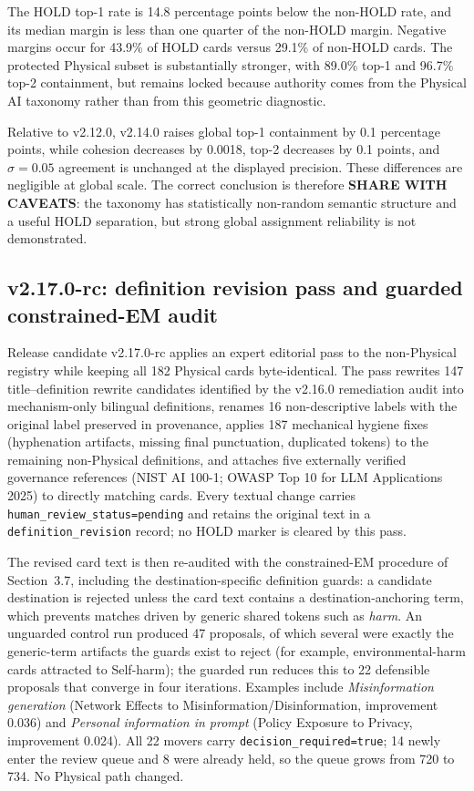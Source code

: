 \documentclass[11pt,a4paper]{article}
\newcommand{\code}[1]{\texttt{#1}}
\begin{document}
The HOLD top-1 rate is 14.8 percentage points below the non-HOLD rate, and its
median margin is less than one quarter of the non-HOLD margin. Negative margins
occur for 43.9\% of HOLD cards versus 29.1\% of non-HOLD cards. The protected
Physical subset is substantially stronger, with 89.0\% top-1 and 96.7\% top-2
containment, but remains locked because authority comes from the Physical AI
taxonomy rather than from this geometric diagnostic.

Relative to v2.12.0, v2.14.0 raises global top-1 containment by 0.1 percentage
points, while cohesion decreases by 0.0018, top-2 decreases by 0.1 points, and
$\sigma=0.05$ agreement is unchanged at the displayed precision. These
differences are negligible at global scale. The correct conclusion is therefore
\textbf{SHARE WITH CAVEATS}: the taxonomy has statistically non-random semantic
structure and a useful HOLD separation, but strong global assignment
reliability is not demonstrated.


\subsection{v2.17.0-rc: definition revision pass and guarded constrained-EM audit}

Release candidate v2.17.0-rc applies an expert editorial pass to the
non-Physical registry while keeping all 182 Physical cards byte-identical.
The pass rewrites 147 title--definition rewrite candidates identified by the
v2.16.0 remediation audit into mechanism-only bilingual definitions, renames
16 non-descriptive labels with the original label preserved in provenance,
applies 187 mechanical hygiene fixes (hyphenation artifacts, missing final
punctuation, duplicated tokens) to the remaining non-Physical definitions,
and attaches five externally verified governance references (NIST AI 100-1;
OWASP Top 10 for LLM Applications 2025) to directly matching cards. Every
textual change carries \code{human\_review\_status=pending} and retains the
original text in a \code{definition\_revision} record; no HOLD marker is
cleared by this pass.

The revised card text is then re-audited with the constrained-EM procedure of
Section~3.7, including the destination-specific definition guards: a
candidate destination is rejected unless the card text contains a
destination-anchoring term, which prevents matches driven by generic shared
tokens such as \emph{harm}. An unguarded control run produced 47 proposals,
of which several were exactly the generic-term artifacts the guards exist to
reject (for example, environmental-harm cards attracted to Self-harm); the
guarded run reduces this to 22 defensible proposals that converge in four
iterations. Examples include \emph{Misinformation generation} (Network
Effects to Misinformation/Disinformation, improvement 0.036) and
\emph{Personal information in prompt} (Policy Exposure to Privacy,
improvement 0.024). All 22 movers carry \code{decision\_required=true}; 14
newly enter the review queue and 8 were already held, so the queue grows from
720 to 734. No Physical path changed.
\end{document}
